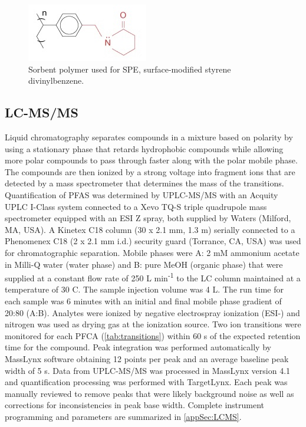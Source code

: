\begin{figure}
    \centering
    \includegraphics{Bilder/SPE_LCMS/mg_spe_strata-x.jpg}
    \caption{Sorbent polymer used for SPE, surface-modified styrene divinylbenzene.}
    \label{fig:StatPhase}
\end{figure}

\subsection{LC-MS/MS}
Liquid chromatography separates compounds in a mixture based on polarity by using a stationary phase that retards hydrophobic compounds while allowing more polar compounds to pass through faster along with the polar mobile phase. The compounds are then ionized by a strong voltage into fragment ions that are detected by a mass spectrometer that determines the mass of the transitions. Quantification of PFAS was determined by UPLC-MS/MS with an Acquity UPLC I-Class system connected to a Xevo TQ-S triple quadrupole mass spectrometer equipped with an ESI Z spray, both supplied by Waters (Milford, MA, USA). A Kinetex C18 column (30 x 2.1 mm, 1.3 \textmu m) serially connected to a Phenomenex C18 (2 x 2.1 mm i.d.) security guard (Torrance, CA, USA) was used for chromatographic separation. Mobile phases were A: 2 mM ammonium acetate in Milli-Q water (water phase) and B: pure MeOH (organic phase) that were supplied at a constant flow rate of 250 \textmu L min\textsuperscript{-1} to the LC column maintained at a temperature of 30 \textdegree C. The sample injection volume was 4 \textmu L. The run time for each sample was 6 minutes with an initial and final mobile phase gradient of 20:80 (A:B). Analytes were ionized by negative electrospray ionization (ESI-) and nitrogen was used as drying gas at the ionization source. Two ion transitions were monitored for each PFCA (\cref{tab:transitions}) within 60 s of the expected retention time for the compound. Peak integration was performed automatically by MassLynx software obtaining 12 points per peak and an average baseline peak width of 5 s. Data from UPLC-MS/MS was processed in MassLynx version 4.1 and quantification processing was performed with TargetLynx. Each peak was manually reviewed to remove peaks that were likely background noise as well as corrections for inconsistencies in peak base width. Complete instrument programming and parameters are summarized in \cref{appSec:LCMS}.

